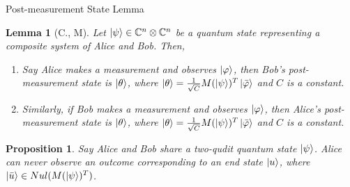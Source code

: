 \documentclass[handout, 10 pt]{beamer}
\newtheorem{prop}{Proposition}
\newtheorem{lemm}{Lemma}
\begin{document}
\begin{frame}{Post-measurement State Lemma}
\begin{lemm} [C., M]
\label{end state lemma}
Let $\ket{\psi} \in \mathbb{C}^n \otimes \mathbb{C}^{n}$ be a quantum state representing a composite system of Alice and Bob. Then,
\begin{enumerate}
\item Say Alice makes a measurement and observes $\ket{\varphi}$, then Bob's post-measurement state is $\ket{\theta}$, where $\ket{\theta}=\frac{1}{\sqrt{C}}M(\ket{\psi})^T \ket{\Bar{\varphi}}$ and $C$ is a constant.
\item Similarly, if Bob makes a measurement and observes $\ket{\varphi}$, then Alice's post-measurement state is $\ket{\theta}$, where $\ket{\theta}=\frac{1}{\sqrt{C}}M(\ket{\psi})^T \ket{\Bar{\varphi}}$ and $C$ is a constant.
\end{enumerate}
\end{lemm}
\pause

\begin{prop}
Say Alice and Bob share a two-qudit quantum state $\ket{\psi}$. Alice can never observe an outcome corresponding to an end state $\ket{u}$, where $\ket{\Bar{u}} \in Nul(M(\ket{\psi})^T)$.
\end{prop}  

\end{frame}
\end{document}
